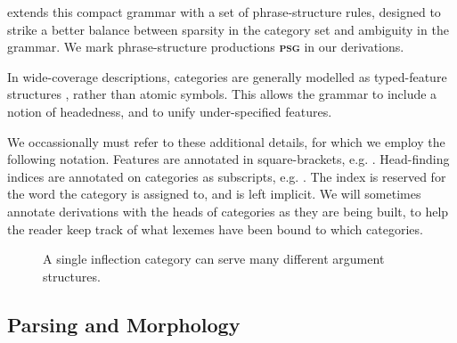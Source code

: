 \documentclass[11pt]{article}
\begin{document}
\ccgbank extends this compact grammar with a set of phrase-structure rules,
designed to strike a better balance between sparsity in the category set and
ambiguity in the grammar. We mark phrase-structure productions
\textbf{\textsc{psg}} in our derivations.

In wide-coverage descriptions, categories are generally modelled as
typed-feature structures \citep{shieber:86}, rather than atomic symbols.
This allows the grammar to include a notion of headedness, and to unify
under-specified features.

We occassionally must refer to these additional details, for which we employ
the following notation. Features are annotated in square-brackets, e.g.
. Head-finding indices are annotated on categories as
subscripts, e.g. . The index  is reserved for
the word the category is assigned to, and is left implicit. We will sometimes
annotate derivations with the heads of categories as they are being built, to help
the reader keep track of what lexemes have been bound to which categories.

\begin{figure*}
\small
\centering
{}
\caption{A single inflection category can serve many different argument structures.
\label{fig:multi_arg}}
\end{figure*}
\subsection{\ccg Parsing and Morphology}
\end{document}
